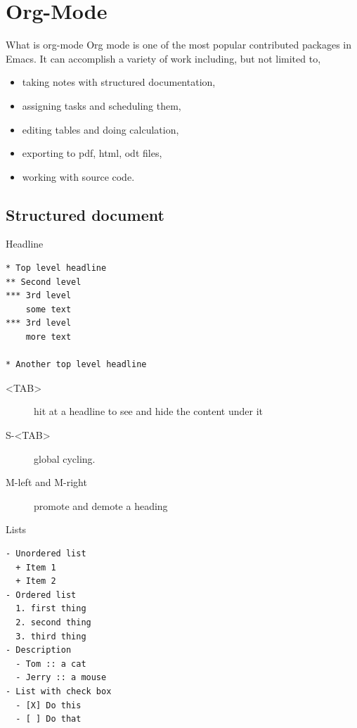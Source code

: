 \documentclass[presentation]{beamer}
\begin{document}
\section{Org-Mode}
\label{sec:orge99c1a7}

\begin{frame}[label={sec:org37079a4}]{What is org-mode}
Org mode is one of the most popular contributed packages in Emacs. It
can accomplish a variety of work including, but not limited to,

\begin{itemize}
\item taking notes with structured documentation,
\item assigning tasks and scheduling them,
\item editing tables and doing calculation,
\item exporting to pdf, html, odt files,
\item \alert{working with source code}.
\end{itemize}
\end{frame}


\subsection{Structured document}
\label{sec:org81e7d51}

\begin{frame}[fragile,label={sec:orgaf62d19}]{Headline}
 \begin{verbatim}
* Top level headline
** Second level
*** 3rd level
    some text
*** 3rd level
    more text

* Another top level headline
\end{verbatim}

\begin{description}
\item[{<TAB>}] hit at a headline to see and hide the content under it
\item[{S-<TAB>}] global cycling.
\item[{M-left and M-right}] promote and demote a heading
\end{description}
\end{frame}

\begin{frame}[fragile,label={sec:org414ebac}]{Lists}
 \begin{verbatim}
- Unordered list
  + Item 1
  + Item 2
- Ordered list
  1. first thing
  2. second thing
  3. third thing
- Description
  - Tom :: a cat
  - Jerry :: a mouse
- List with check box
  - [X] Do this
  - [ ] Do that
\end{verbatim}
\end{frame}
\end{document}
